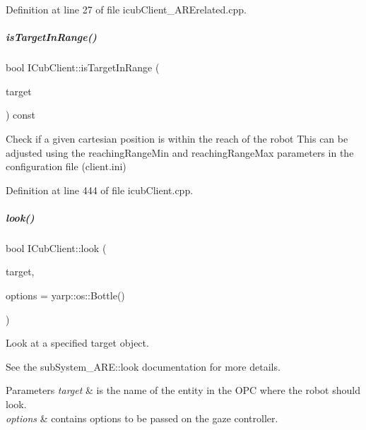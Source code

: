 Definition at line 27 of file icub\+Client\+\_\+\+A\+R\+Erelated.\+cpp.

\mbox{\label{group__icubclient__clients_ae2c6388e184ee5f8feeb5c79901f32d5}} 
\subparagraph{\texorpdfstring{is\+Target\+In\+Range()}{isTargetInRange()}}
{\footnotesize\ttfamily bool I\+Cub\+Client\+::is\+Target\+In\+Range (\begin{DoxyParamCaption}\item[{const yarp\+::sig\+::\+Vector\+Of$<$ double $>$ \&}]{target }\end{DoxyParamCaption}) const}



Check if a given cartesian position is within the reach of the robot This can be adjusted using the reaching\+Range\+Min and reaching\+Range\+Max parameters in the configuration file (client.\+ini) 



Definition at line 444 of file icub\+Client.\+cpp.

\mbox{\label{group__icubclient__clients_ac045289e67ede0aa0a22869600a6021d}} 
\subparagraph{\texorpdfstring{look()}{look()}\hspace{0.1cm}{\footnotesize\ttfamily [1/2]}}
{\footnotesize\ttfamily bool I\+Cub\+Client\+::look (\begin{DoxyParamCaption}\item[{const std\+::string \&}]{target,  }\item[{const yarp\+::os\+::\+Bottle \&}]{options = {\ttfamily yarp\+:\+:os\+:\+:Bottle()} }\end{DoxyParamCaption})}



Look at a specified target object. 

See the sub\+System\+\_\+\+A\+R\+E\+::look documentation for more details. 
\begin{DoxyParams}{Parameters}
{\em target} & is the name of the entity in the O\+PC where the robot should look. \\
\hline
{\em options} & contains options to be passed on the gaze controller. \\
\hline
\end{DoxyParams}


